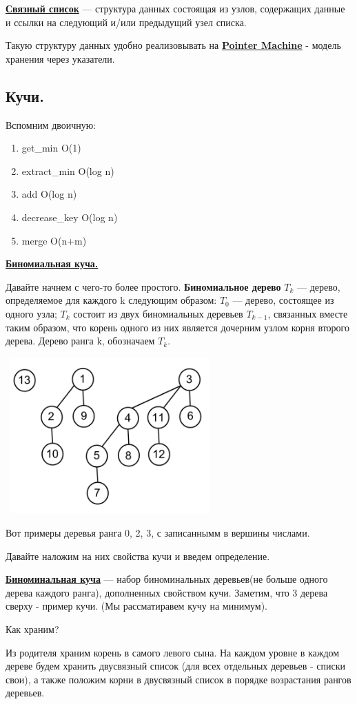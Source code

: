 \documentclass{article}
\newcommand{\deff}[1]{\underline{\textbf{#1}}}
\begin{document}
\deff{Связный список} — структура данных состоящая из узлов, содержащих данные и ссылки на следующий и/или предыдущий узел списка.

Такую структуру данных удобно реализовывать на \deff{Pointer Machine} - модель хранения через указатели. 
\subsection*{Кучи.}
Вспомним двоичную:
\begin{enumerate}
    \item get\_min  O(1)
    \item extract\_min O(log n)
    \item add O(log n)
    \item decrease\_key O(log n)
    \item merge O(n+m)
\end{enumerate}
\deff{Биномиальная куча.}

Давайте начнем с чего-то более простого. \textbf{ Биномиальное дерево} $T_k$ --- дерево, определяемое для каждого k следующим образом: $T_0$ --- дерево, состоящее из одного узла; $T_k$ состоит из двух биномиальных деревьев $T_{k-
1}$, связанных вместе таким образом, что корень одного из них является дочерним узлом корня второго дерева. Дерево ранга k, обозначаем $T_k$.

\includegraphics[width=8cm, height=6cm]{9.1.png}

Вот примеры деревья ранга 0, 2, 3, с записаннымм в вершины числами.

Давайте наложим на них свойства кучи и введем определение. 

\deff{Биноминальная куча} --- набор биноминальных деревьев(не больше одного дерева каждого ранга), дополненных свойством кучи. Заметим, что 3 дерева сверху - пример кучи. (Мы рассматиравем кучу на минимум).

Как храним?

Из родителя храним корень в самого левого сына. На каждом уровне в каждом дереве будем хранить двусвязный список (для всех отдельных деревьев - списки свои), а также положим корни в двусвязный список в порядке возрастания рангов деревьев.
\end{document}
